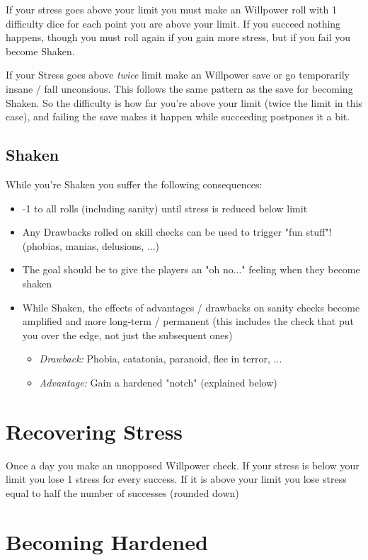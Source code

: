 If your stress goes above your limit you must make an Willpower roll with 1 difficulty dice for each point you are above your limit.
If you succeed nothing happens, though you must roll again if you gain more stress,
but if you fail you become Shaken.

If your Stress goes above \textit{twice} limit make an Willpower save or go temporarily insane / fall unconsious.
This follows the same pattern as the save for becoming Shaken. So the difficulty is how far you're above your limit (twice the limit in this case), and failing the save makes it happen while succeeding postpones it a bit.


\subsection{Shaken}
While you're Shaken you suffer the following consequences:
\begin{itemize}
    \item -1 to all rolls (including sanity) until stress is reduced below limit
    \item Any Drawbacks rolled on skill checks can be used to trigger "fun stuff"! (phobias, manias, delusions, ...)
    \item The goal should be to give the players an "oh no..." feeling when they become shaken
    \item While Shaken, the effects of advantages / drawbacks on sanity checks become amplified and more long-term / permanent (this includes the check that put you over the edge, not just the subsequent ones)
    \begin{itemize}
        \item \textit{Drawback:} Phobia, catatonia, paranoid, flee in terror, ...
        \item \textit{Advantage:} Gain a hardened "notch" (explained below)
    \end{itemize}
\end{itemize}

\section{Recovering Stress}
Once a day you make an unopposed Willpower check. If your stress is below your limit you lose 1 stress for every success. If it is above your limit you lose stress equal to half the number of successes (rounded down) 


\section{Becoming Hardened}

